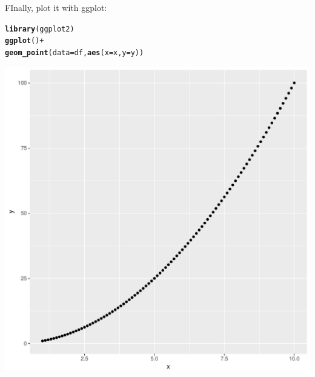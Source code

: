 \documentclass{article}\usepackage[]{graphicx}\usepackage[]{color}
\makeatletter
\def\maxwidth{ %
  \ifdim\Gin@nat@width>\linewidth
    \linewidth
  \else
    \Gin@nat@width
  \fi
}
\newcommand{\hlopt}[1]{\textcolor[rgb]{0,0,0}{#1}}%
\newcommand{\hlstd}[1]{\textcolor[rgb]{0.345,0.345,0.345}{#1}}%
\newcommand{\hlkwc}[1]{\textcolor[rgb]{0.333,0.667,0.333}{#1}}%
\newcommand{\hlkwd}[1]{\textcolor[rgb]{0.737,0.353,0.396}{\textbf{#1}}}%
\newenvironment{kframe}{%
 \def\at@end@of@kframe{}%
 \ifinner\ifhmode%
  \def\at@end@of@kframe{\end{minipage}}%
  \begin{minipage}{\columnwidth}%
 \fi\fi%
 \def\FrameCommand##1{\hskip\@totalleftmargin \hskip-\fboxsep
 \colorbox{shadecolor}{##1}\hskip-\fboxsep
     \hskip-\linewidth \hskip-\@totalleftmargin \hskip\columnwidth}%
 \MakeFramed {\advance\hsize-\width
   \@totalleftmargin\z@ \linewidth\hsize
   \@setminipage}}%
 {\par\unskip\endMakeFramed%
 \at@end@of@kframe}
\newenvironment{knitrout}{}{} %
\makeatother
\begin{document}
FInally, plot it with ggplot:
\begin{knitrout}
\color{fgcolor}\begin{kframe}
\begin{alltt}
\hlkwd{library}\hlstd{(ggplot2)}
\hlkwd{ggplot}\hlstd{()}\hlopt{+}
  \hlkwd{geom_point}\hlstd{(}\hlkwc{data}\hlstd{=df,}\hlkwd{aes}\hlstd{(}\hlkwc{x}\hlstd{=x,}\hlkwc{y}\hlstd{=y))}
\end{alltt}
\end{kframe}
\includegraphics[width=\maxwidth]{figure/unnamed-chunk-10-1} 

\end{knitrout}
\end{document}
